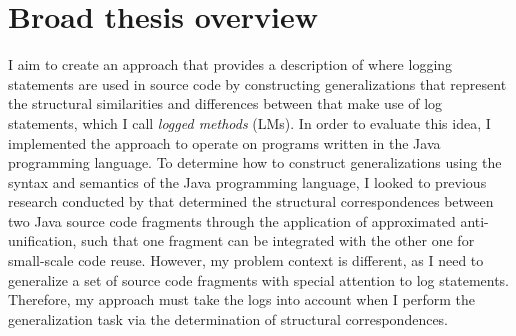 %
%
%



\section{Broad thesis overview} \label{intro-overview}
I aim to create an approach that provides a description of where logging statements are used in source code by constructing generalizations that represent the structural similarities and differences between  that make use of log statements, which I call \emph{logged methods} (LMs). In order to evaluate this idea, I implemented the approach to operate on programs written in the Java programming language. To determine how to construct generalizations using the syntax and semantics of the Java programming language, I looked to previous research conducted by \citet{2008:fse:cottrell} that determined the structural correspondences between two Java source code fragments through the application of approximated anti-unification, such that one fragment can be integrated with the other one for small-scale code reuse. However, my problem context is different, as I need to generalize a set of source code fragments with special attention to log statements. Therefore, my approach must take the logs into account when I perform the generalization task via the determination of structural correspondences.

